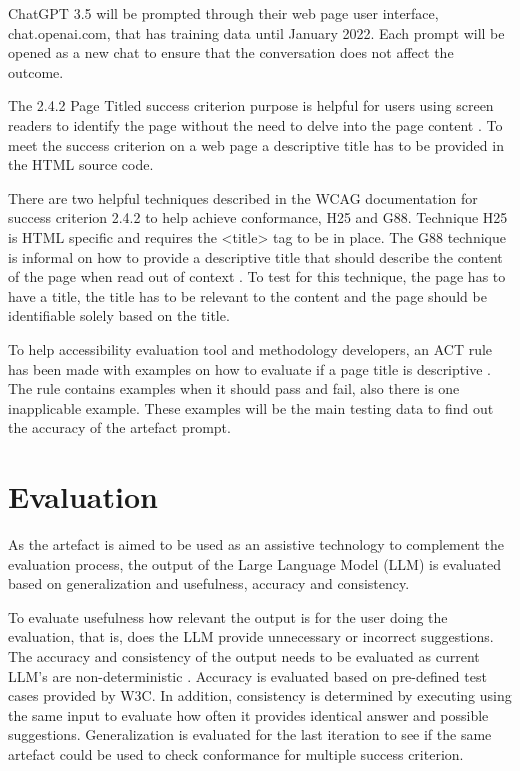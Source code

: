 ChatGPT 3.5 will be prompted through their web page user interface, chat.openai.com, that has training data until January 2022. Each prompt will be opened as a new chat to ensure that the conversation does not affect the outcome.

The 2.4.2 Page Titled success criterion purpose is helpful for users using screen readers to identify the page without the need to delve into the page content \citep{wcag_page_titled}. To meet the success criterion on a web page a descriptive title has to be provided in the HTML source code. 

There are two helpful techniques described in the WCAG documentation for success criterion 2.4.2 to help achieve conformance, H25 and G88. Technique H25 is HTML specific and requires the <title> tag to be in place. The G88 technique is informal on how to provide a descriptive title that should describe the content of the page when read out of context \citep{g88}. To test for this technique, the page has to have a title, the title has to be relevant to the content and the page should be identifiable solely based on the title.

To help accessibility evaluation tool and methodology developers, an ACT rule has been made with examples on how to evaluate if a page title is descriptive \citep{act_rule_g88}. The rule contains examples when it should pass and fail, also there is one inapplicable example. These examples will be the main testing data to find out the accuracy of the artefact prompt.

\section{Evaluation}

As the artefact is aimed to be used as an assistive technology to complement the evaluation process, the output of the Large Language Model (LLM) is evaluated based on generalization and usefulness, accuracy and consistency. 

To evaluate usefulness how relevant the output is for the user doing the evaluation, that is, does the LLM provide unnecessary or incorrect suggestions. The accuracy and consistency of the output needs to be evaluated as current LLM's are non-deterministic \citep{ouyang2023llm}. Accuracy is evaluated based on pre-defined test cases provided by W3C. In addition, consistency is determined by executing using the same input to evaluate how often it provides identical answer and possible suggestions. Generalization is evaluated for the last iteration to see if the same artefact could be used to check conformance for multiple success criterion.